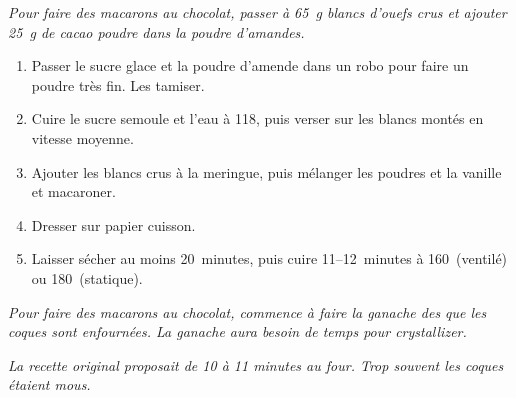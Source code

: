 


\begin{ingredients}
\end{ingredients}

{\it Pour faire des macarons au chocolat, passer \`a 65~g blancs
  d'ouefs crus et ajouter 25~g de cacao poudre dans la poudre
  d'amandes.}

\begin{recipe}
  \begin{enumerate}

  \item Passer le sucre glace et la poudre d'amende dans un robo pour
    faire un poudre tr\`es fin.  Les tamiser.

  \item Cuire le sucre semoule et l'eau \`a 118\degreeC, puis verser sur les
    blancs mont\'es en vitesse moyenne.

  \item Ajouter les blancs crus \`a la meringue, puis m\'elanger les
    poudres et la vanille et macaroner.

  \item Dresser sur papier cuisson.

  \item Laisser s\'echer au moins 20~minutes, puis cuire
    11--12~minutes \`a 160\degreeC\ (ventil\'e) ou 180\degreeC\ (statique).
  \end{enumerate}
\end{recipe}

{\it Pour faire des macarons au chocolat, commence à faire la ganache
  des que les coques sont enfournées.  La ganache aura besoin de temps
  pour crystallizer.}

{\it La recette original proposait de 10 à 11 minutes au four.  Trop souvent les coques étaient mous.}


\begin{ingredients}
\end{ingredients}


